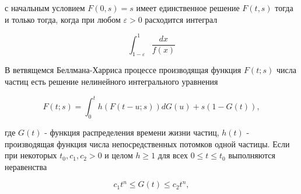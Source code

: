 \documentclass[10pt]{article}
\begin{document}
с начальным условием $F(0, s)=s$ имеет единственное решение $F(t, s)$ тогда и только тогда, когда при любом $\varepsilon>0$ расходится интеграл



\[

\int_{1-\varepsilon}^{1} \frac{d x}{f(x)}

\]



В ветвящемся Беллмана-Харриса процессе производящая функция $F(t ; s)$ числа частиц есть решение нелинейного интегрального уравнения



\[

F(t ; s)=\int_{0}^{t} h(F(t-u ; s)) d G(u)+s(1-G(t)),

\]



где $G(t)$ - функция распределения времени жизни частиц, $h(t)$ - производящая функция числа непосредственных потомков одной частицы. Если при некоторых $t_{0}, c_{1}, c_{2}>0$ и целом $h \geqslant 1$ для всех $0 \leqslant t \leqslant t_{0}$ выполняются неравенства



\[

c_{1} t^{n} \leqslant G(t) \leqslant c_{2} t^{n},

\]
\end{document}
